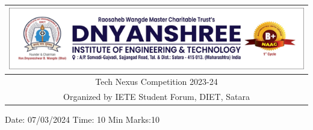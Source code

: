 \documentclass[legalpaper, 12pt, addpoints]{exam}
\begin{document}
\def\arraystretch{2}
\begin{longtable}{lp{}p{}r}
\multicolumn{4}{c}{\includegraphics[width= \textwidth]{dietlogo}} \\ 
\hline 
\multicolumn{4}{c}{Tech Nexus Competition 2023-24} \\
\multicolumn{4}{c}{Organized by IETE Student Forum, DIET, Satara}
\end{longtable}
\parbox{6in}{
Date: 07/03/2024 \hfill Time: 10 Min \hfill Marks:10}
\end{document}
